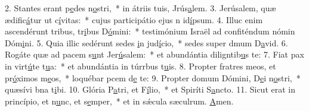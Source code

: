 2. Stantes erant p\uline{e}des n\uline{o}stri,~* in átriis tuis, Jrús\uline{a}lem.
3. Jerúsalem, quæ ædific\uline{á}tur ut c\uline{í}vitas:~* cujus participátio ejus n id\uline{í}psum.
4. Illuc enim ascendérunt tribus, tr\uline{i}bus D\uline{ó}mini:~* testimónium Israël ad confiténdum nómin Dóm\uline{i}ni.
5. Quia illic sedérunt sedes \uline{i}n jud\uline{í}cio,~* sedes super dmum D\uline{a}vid.
6. Rogáte quæ ad pacem s\uline{u}nt Jer\uline{ú}salem:~* et abundántia diligntib\uline{u}s te:
7. Fiat pax in virt\uline{ú}te t\uline{u}a:~* et abundántia in túrrbus t\uline{u}is.
8. Propter fratres meos, et pr\uline{ó}ximos m\uline{e}os,~* loquébar pcem d\uline{e} te:
9. Propter domum Dómini, D\uline{e}i n\uline{o}stri,~* quæsívi bna t\uline{i}bi.
10. Glória P\uline{a}tri, et F\uline{í}lio,~* et Spiríti S\uline{a}ncto.
11. Sicut erat in princípio, et n\uline{u}nc, et s\uline{e}mper,~* et in sǽcula sæculrum. \uline{A}men.
